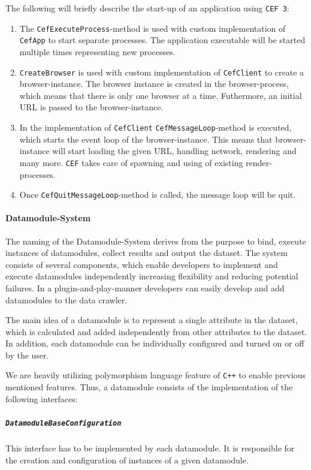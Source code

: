 The following will briefly describe the start-up of an application using \texttt{CEF 3}:
\begin{enumerate}
	\item The \texttt{CefExecuteProcess}-method is used with custom implementation of \texttt{CefApp} to start separate processes. The application executable will be started multiple times representing new processes.
	\item \texttt{CreateBrowser} is used with custom implementation of \texttt{CefClient} to create a browser-instance. The browser instance is created in the browser-process, which means that there is only one browser at a time. Futhermore, an initial URL is passed to the browser-instance.
	\item In the implementation of \texttt{CefClient} \texttt{CefMessageLoop}-method is executed, which starts the event loop of the browser-instance. This means that browser-instance will start loading the given URL, handling network, rendering and many more. \texttt{CEF} takes care of spawning and using of existing render-processes.
	\item Once \texttt{CefQuitMessageLoop}-method is called, the message loop will be quit.
\end{enumerate}

\paragraph*{Datamodule-System}
\label{datacrawler_datamodulesystem}
The naming of the Datamodule-System derives from the purpose to bind, execute instances of datamodules, collect results and output the dataset. The system consists of several components, which enable developers to implement and execute datamodules independently increasing flexibility and reducing potential failures. In a plugin-and-play-manner developers can easily develop and add datamodules to the data crawler.

The main idea of a datamodule is to represent a single attribute in the dataset, which is calculated and added independently from other attributes to the dataset. In addition, each datamodule can be individually configured and turned on or off by the user.

We are heavily utilizing polymorphism language feature of \texttt{C++} to enable previous mentioned features. Thus, a datamodule consists of the implementation of the following interfaces:

\subparagraph*{\texttt{DatamoduleBaseConfiguration}}
	This interface has to be implemented by each datamodule. It is responsible for the creation and configuration of instances of a given datamodule.


